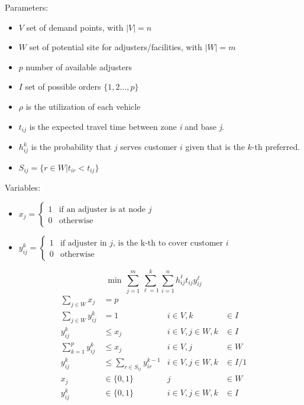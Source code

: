 \begin{frame}
  Parameters:
  \begin{itemize}
  \item $V$ set of demand points, with $|V| = n$
  \item $W$ set of potential site for adjusters/facilities, with $|W| = m$
  \item $p$ number of available adjusters
  \item $I$  set of possible orders $\{1,2\ldots,p\}$
  \item $\rho$ is the utilization of each vehicle
  \item $t_{ij}$ is the expected travel time between zone \textit{i} and base \textit{j}.
  \item $h_{ij}^{k}$ is the probability that $j$ serves customer $i$ given that
    is the $k$-th preferred.
  \item $S_{ij} = \{r\in W | t_{ir} < t_{ij}\}$
  \end{itemize}
  
  Variables:
  \begin{itemize}
  \item $x_j =
    \begin{cases} 
      1 & \mbox{if an adjuster is at node } j \\
      0 & \mbox{otherwise}
    \end{cases}$
  \item $y_{ij}^k =
    \begin{cases} 
      1 & \mbox{if adjuster in } j \mbox{, is the k-th to cover customer }i \\
      0 & \mbox{otherwise}
  \end{cases}$
  \end{itemize}
\end{frame}

\begin{frame}[allowframebreaks]{}{}

{\small
  \begin{equation}
    \min \, \sum_{j=1}^{m}{\sum_{\ell=1}^{k}{\sum_{i=1}^{n}{h_{ij}^{\ell}t_{ij}y_{ij}^{\ell}}}}
  \end{equation}
}
{\small
  \begin{align}
    \sum_{j \in W}{x_j} & = p               &                                  &\\
    \sum_{j \in W}{y_{ij}^{k}} & = 1        &          i \in V, k &\in I \\
    y_{ij}^{k} & \leq x_j                   &  i \in V,j \in W, k &\in I \\
    \sum_{k = 1}^{p}{y_{ij}^{k}} & \leq x_j &          i \in V, j &\in W \\
    y_{ij}^{k} &\leq \sum_{r\in S_{ij}}{y_{ir}^{k-1}} &  i \in V,j \in W, k &\in I/{1} \\
    x_{j} & \in \{0,1\}      &                  j &\in W \nonumber\\
    y_{ij}^{k} & \in \{0,1\} &  i \in V,j \in W,k &\in I \nonumber
  \end{align}
}
\end{frame}

